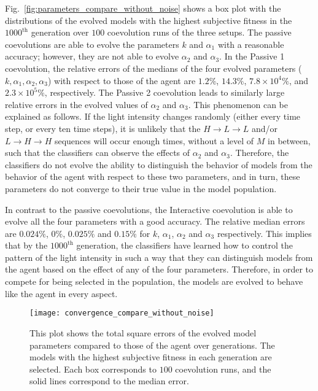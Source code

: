 Fig.~\ref{fig:parameters_compare_without_noise} shows a box plot with the distributions of the evolved models with the highest subjective fitness in the $1000^\textrm{th}$ generation over $100$ coevolution runs of the three setups. The passive coevolutions are able to evolve the parameters $k$ and $\alpha_1$ with a reasonable accuracy; however, they are not able to evolve $\alpha_2$ and $\alpha_3$. In the Passive 1 coevolution, the relative errors of the medians of the four evolved parameters ($k,\alpha_1,\alpha_2,\alpha_3$) with respect to those of the agent are $1.2\%$, $14.3\%$, $7.8\times10^4\%$, and $2.3\times10^5\%$, respectively. The Passive 2 coevolution leads to similarly large relative errors in the evolved values of $\alpha_2$ and $\alpha_3$. This phenomenon can be explained as follows. If the light intensity changes randomly (either every time step, or every ten time steps), it is unlikely that the 
$H\rightarrow L\rightarrow L$ and/or $L\rightarrow H\rightarrow H$ sequences 
will occur enough times, without a level of $M$ in between, such that the classifiers can observe the effects of $\alpha_2$ and $\alpha_3$. Therefore, the classifiers do not evolve the ability to distinguish the behavior of models from the behavior of the agent with respect to these two parameters, and in turn, these parameters do not converge to their true value in the model population.

In contrast to the passive coevolutions, the Interactive coevolution is able to evolve all the four parameters with a good accuracy. The relative median errors are $0.024\%$, $0\%$, $0.025\%$ and $0.15\%$ for $k$, $\alpha_1$, $\alpha_2$ and $\alpha_3$ respectively. This implies that by the $1000^{\textrm{th}}$ generation, the classifiers have learned how to control the pattern of the light intensity in such a way that they can distinguish models from the agent based on the effect of any of the four parameters. Therefore, in order to compete for being selected in the population, the models are evolved to behave like the agent in every aspect.

\begin{figure}[!t]%
	    \centering
		\texttt{[image: convergence\_compare\_without\_noise]}
		\caption{This plot shows the total square errors of the evolved model parameters compared to those of the agent over generations. The models with the highest subjective fitness in each generation are selected. Each box corresponds to $100$ coevolution runs, and the solid lines correspond to the median error.\label{fig:convergence_compare}}
\end{figure}

